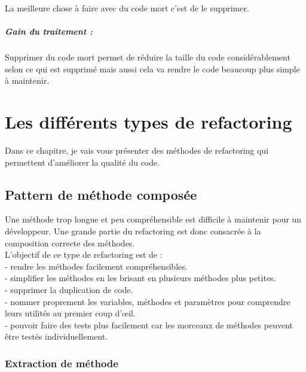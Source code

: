 \documentclass[a4paper,twoside,12pt,openright]{report}
\begin{document}
La meilleure chose à faire avec du code mort c'est de le supprimer.\\

\paragraph{Gain du traitement :}
Supprimer du code mort permet de réduire la taille du code considérablement selon ce qui est supprimé mais aussi cela va rendre le code beaucoup plus simple à maintenir.\\




\chapter{Les différents types de refactoring}
Dans ce chapitre, je vais vous présenter des méthodes de refactoring qui permettent d'améliorer la qualité du code.\\

\section{Pattern de méthode composée}
Une méthode trop longue et peu compréhensible est difficile à maintenir pour un développeur.
Une grande partie du refactoring est donc consacrée à la composition correcte des méthodes.\cite{ref5}\\

L'objectif de ce type de refactoring est de :\\
- rendre les méthodes facilement compréhensibles.\\
- simplifier les méthodes en les brisant en plusieurs méthodes plus petites.\\
- supprimer la duplication de code.\\
- nommer proprement les variables, méthodes et paramètres pour comprendre leurs utilités au premier coup d'œil.\\
- pouvoir faire des tests plus facilement car les morceaux de méthodes peuvent être testés individuellement.\cite{ref6}

\newpage

\subsection{Extraction de méthode}
\end{document}
